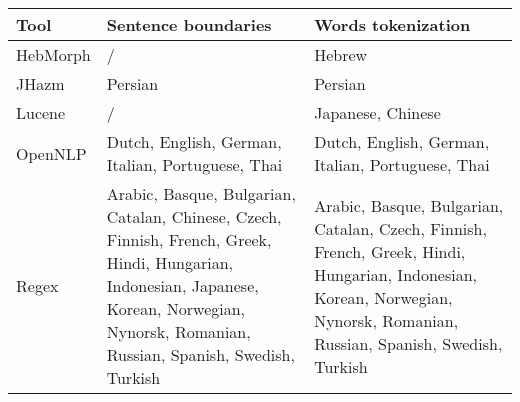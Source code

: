 \begin{tabular}{p{}p{}p{}} 
	\hline \hline
	
	Tool & Sentence boundaries & Words tokenization \\
	
	\hline\hline
	
	HebMorph & 
	/ & 
	Hebrew \\
	\hline
	
	JHazm &
	Persian& 
	Persian\\
	\hline
	
	Lucene &
	/&
	Japanese, Chinese \\
	\hline
	
	
	OpenNLP &
	Dutch, English, German, Italian, Portuguese, Thai &
	Dutch, English, German, Italian, Portuguese, Thai \\
	\hline
	

	Regex & 
	Arabic, Basque, Bulgarian, Catalan, Chinese, Czech, Finnish, French, Greek, Hindi, Hungarian, Indonesian, Japanese, Korean, Norwegian, Nynorsk, Romanian, Russian, Spanish, Swedish, Turkish & 
	Arabic, Basque, Bulgarian, Catalan, Czech, Finnish, French, Greek, Hindi, Hungarian, Indonesian, Korean, Norwegian, Nynorsk, Romanian, Russian, Spanish, Swedish, Turkish\\
	
	
	\hline \hline
\end{tabular}